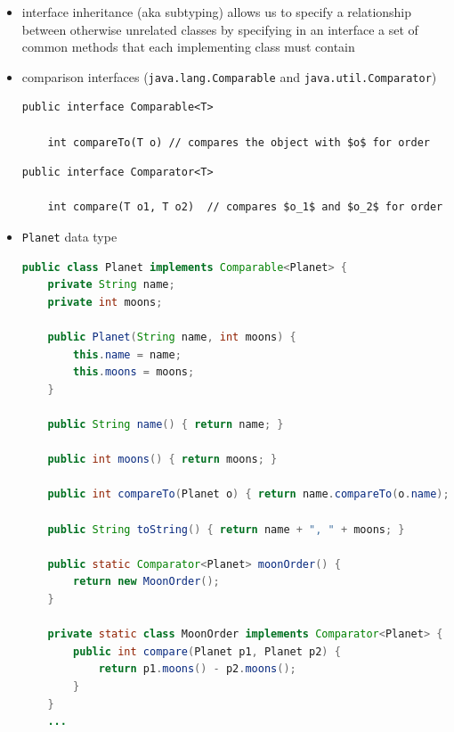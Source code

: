 \documentclass[8pt,a4paper,compress]{beamer}
\begin{document}
\begin{frame}[fragile]
\begin{itemize}
\item interface inheritance (aka subtyping) allows us to specify a relationship between otherwise unrelated classes by specifying in
an interface a set of common methods that each implementing class must contain

\item comparison interfaces (\lstinline{java.lang.Comparable} and \lstinline{java.util.Comparator})
\begin{lstlisting}[language={},mathescape]
public interface Comparable<T>

    int compareTo(T o) // compares the object with $o$ for order
\end{lstlisting}

\begin{lstlisting}[language={},mathescape]
public interface Comparator<T>

    int compare(T o1, T o2)  // compares $o_1$ and $o_2$ for order
\end{lstlisting}
\end{itemize}
\end{frame}

\begin{frame}[fragile]
\begin{itemize}
\item \lstinline{Planet} data type
\begin{lstlisting}[language=Java]
public class Planet implements Comparable<Planet> {
    private String name;
    private int moons;

    public Planet(String name, int moons) {
        this.name = name;
        this.moons = moons;
    }
    
    public String name() { return name; }

    public int moons() { return moons; }

    public int compareTo(Planet o) { return name.compareTo(o.name); }
    
    public String toString() { return name + ", " + moons; }

    public static Comparator<Planet> moonOrder() { 
        return new MoonOrder(); 
    }

    private static class MoonOrder implements Comparator<Planet> {
        public int compare(Planet p1, Planet p2) {
            return p1.moons() - p2.moons();
        }
    }
    ...
\end{lstlisting}
\end{itemize}
\end{frame}
\end{document}
